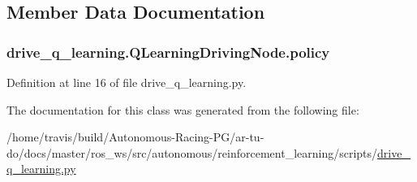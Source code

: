 \subsection{Member Data Documentation}
\subsubsection[{\texorpdfstring{policy}{policy}}]{\setlength{\rightskip}{0pt plus 5cm}drive\+\_\+q\+\_\+learning.\+Q\+Learning\+Driving\+Node.\+policy}\hypertarget{classdrive__q__learning_1_1_q_learning_driving_node_adac072d48916c8128e83c330578af70e}{}\label{classdrive__q__learning_1_1_q_learning_driving_node_adac072d48916c8128e83c330578af70e}


Definition at line 16 of file drive\+\_\+q\+\_\+learning.\+py.



The documentation for this class was generated from the following file\+:\begin{DoxyCompactItemize}
\item 
/home/travis/build/\+Autonomous-\/\+Racing-\/\+P\+G/ar-\/tu-\/do/docs/master/ros\+\_\+ws/src/autonomous/reinforcement\+\_\+learning/scripts/\hyperlink{drive__q__learning_8py}{drive\+\_\+q\+\_\+learning.\+py}\end{DoxyCompactItemize}

